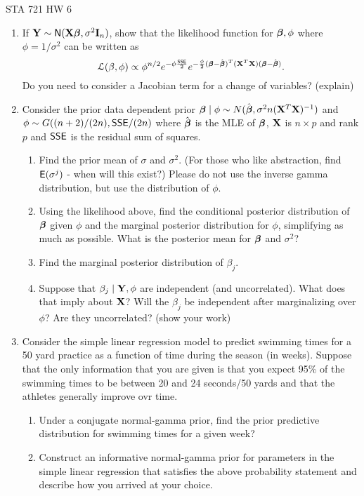 \documentclass{article}
\begin{document}
\begin{center}
  STA 721 HW 6
\end{center}


\begin{enumerate}
\item If $\mathbf{Y} \sim \textsf{N}(\mathbf{X}\boldsymbol{\beta}, \sigma^2 \mathbf{I}_n)$, show that the likelihood
  function for $\boldsymbol{\beta}, \phi$ where $\phi = 1/\sigma^2$ can be written as 
 $${\cal{L}}(\beta, \phi) \propto \phi^{n/2} e^{- \phi \frac{\textsf{SSE}}{2}}
e^{-\frac{\phi}{2} (\boldsymbol{\beta} - \hat{\boldsymbol{\beta}})^T(\mathbf{X}^T\mathbf{X}) (\boldsymbol{\beta} - \hat{\boldsymbol{\beta}})}.$$   Do you
need to consider a Jacobian term for a change of variables?  (explain)

\item Consider the prior data dependent prior $\boldsymbol{\beta} \mid \phi \sim N(\hat{\boldsymbol{\beta}}, \sigma^2 n
  (\mathbf{X}^T\mathbf{X})^{-1})$ and   $\phi \sim G((n + 2)/(2n), \textsf{SSE}/(2n)$
where $\hat{\boldsymbol{\beta}}$ is the MLE of $\boldsymbol{\beta}$, $\mathbf{X}$ is $n \times p$ and rank $p$
and $\textsf{SSE}$ is the residual sum of squares.
  \begin{enumerate}
  \item  Find the prior mean of $\sigma$ and $\sigma^2$.  (For those
    who like abstraction, find $\textsf{E}(\sigma^j)$ - when will this exist?)
    Please do not use the inverse gamma distribution, but use the
    distribution of $\phi$.
  \item  Using the likelihood above, find the conditional posterior distribution of $\boldsymbol{\beta}$ given
    $\phi$ and the marginal posterior distribution for $\phi$,
    simplifying as much as possible.  What
    is the posterior mean for $\boldsymbol{\beta}$ and $\sigma^2$?   
  \item Find the marginal posterior distribution of $\beta_j$.
  \item Suppose that $\beta_j \mid \mathbf{Y}, \phi$ are independent (and
    uncorrelated).  What does that imply about $\mathbf{X}$?  Will the
    $\beta_j$ be independent after marginalizing over $\phi$?  Are
    they uncorrelated?  (show your work)
  \end{enumerate}
\item Consider the simple linear regression model to predict swimming
  times for a 50 yard practice as a function of time during the season
  (in weeks).  Suppose that the only information that you are given is
  that you expect 95\% of the swimming times to be between 20 and 24
  seconds/50 yards and that the athletes generally improve ovr time.
  \begin{enumerate}
  \item Under a conjugate normal-gamma prior, find the prior
    predictive distribution for swimming times for a given week?
  \item 
  Construct an informative normal-gamma prior for parameters in the
  simple linear  regression that satisfies the above probability  statement  and
  describe how you arrived at your choice.


\end{enumerate}
\end{enumerate}
\end{document}
